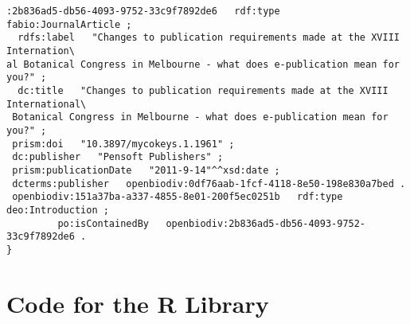 \begin{lstlisting}[language=SPARQL,
caption=., label=listing:parent-node-rdf, basicstyle=\ttfamily\scriptsize]
:2b836ad5-db56-4093-9752-33c9f7892de6   rdf:type   fabio:JournalArticle ;
  rdfs:label   "Changes to publication requirements made at the XVIII Internation\
al Botanical Congress in Melbourne - what does e-publication mean for you?" ;
  dc:title   "Changes to publication requirements made at the XVIII International\
 Botanical Congress in Melbourne - what does e-publication mean for you?" ;
 prism:doi   "10.3897/mycokeys.1.1961" ;
 dc:publisher   "Pensoft Publishers" ;
 prism:publicationDate   "2011-9-14"^^xsd:date ;
 dcterms:publisher   openbiodiv:0df76aab-1fcf-4118-8e50-198e830a7bed .
 openbiodiv:151a37ba-a337-4855-8e01-200f5ec0251b   rdf:type   deo:Introduction ;
         po:isContainedBy   openbiodiv:2b836ad5-db56-4093-9752-33c9f7892de6 .
}
\end{lstlisting}





\section{Code for the R Library}

